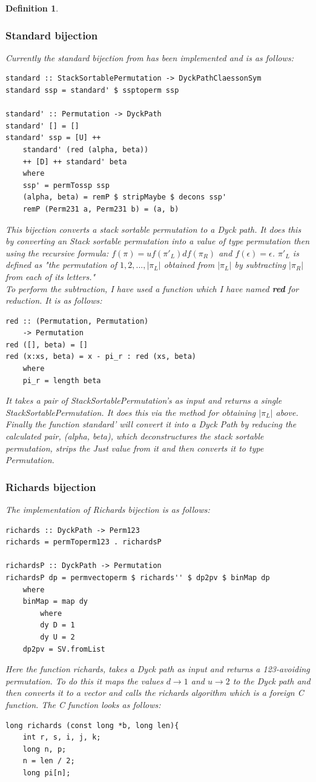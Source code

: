 \documentclass[12pt]{article}
\newtheorem{definition}{Definition}
\begin{document}
\begin{definition}
\subsubsection{Standard bijection}
Currently the standard bijection from \cite{Clae01} has been implemented and is as follows:
\begin{lstlisting}
standard :: StackSortablePermutation -> DyckPathClaessonSym
standard ssp = standard' $ ssptoperm ssp

standard' :: Permutation -> DyckPath
standard' [] = []
standard' ssp = [U] ++ 
	standard' (red (alpha, beta)) 
	++ [D] ++ standard' beta
	where
	ssp' = permTossp ssp
	(alpha, beta) = remP $ stripMaybe $ decons ssp'
	remP (Perm231 a, Perm231 b) = (a, b)
\end{lstlisting}
This bijection converts a stack sortable permutation to a Dyck path. It does this by converting an Stack sortable permutation into a value of type permutation then using the recursive formula: $f(\pi) = uf(\pi'_L)df(\pi_R)$ and $f(\epsilon) = \epsilon$. $\pi'_L$ is defined as "the permutation of $1, 2, ..., |\pi_L|$ obtained from $|\pi_L|$ by subtracting $|\pi_R|$ from each of its letters."\cite{Clae01}\\
To perform the subtraction, I have used a function which I have named {\bf red} for reduction. It is as follows:
\begin{lstlisting}
red :: (Permutation, Permutation) 
	-> Permutation
red ([], beta) = []
red (x:xs, beta) = x - pi_r : red (xs, beta)
	where
	pi_r = length beta
\end{lstlisting}
It takes a pair of StackSortablePermutation's as input and returns a single StackSortablePermutation. It does this via the method for obtaining $|\pi_L|$ above. Finally the function standard' will convert it into a Dyck Path by reducing the calculated pair, (alpha, beta), which deconstructures the stack sortable permutation, strips the Just value from it and then converts it to type Permutation.
\subsubsection{Richards bijection}
The implementation of Richards bijection is as follows:
\begin{lstlisting}
richards :: DyckPath -> Perm123
richards = permToperm123 . richardsP

richardsP :: DyckPath -> Permutation
richardsP dp = permvectoperm $ richards'' $ dp2pv $ binMap dp
	where
	binMap = map dy	
		where
		dy D = 1
		dy U = 2
	dp2pv = SV.fromList
\end{lstlisting}
Here the function {\it richards}, takes a Dyck path as input and returns a 123-avoiding permutation. To do this it maps the values $d \rightarrow 1$ and $u \rightarrow 2$ to the Dyck path and then converts it to a vector and calls the richards algorithm which is a foreign C function. The C function looks as follows:
\begin{lstlisting}
long richards (const long *b, long len){
	int r, s, i, j, k;
	long n, p;
	n = len / 2;
	long pi[n];
		

\end{lstlisting}
\end{definition}
\end{document}
